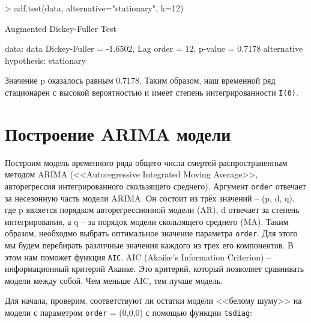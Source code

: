 \documentclass[a4paper]{extarticle}
\begin{document}
\begin{Schunk}
\begin{Sinput}
> adf.test(data, alternative="stationary", k=12)
\end{Sinput}
\begin{Soutput}
	Augmented Dickey-Fuller Test

data:  data
Dickey-Fuller = -1.6502, Lag order = 12, p-value = 0.7178
alternative hypothesis: stationary
\end{Soutput}
\end{Schunk}

Значение p оказалось равным 0.7178. Таким образом, наш временной ряд стационарен с высокой вероятностью и имеет степень интегрированности \texttt{I(0)}.


         
\section{Построение ARIMA модели}

Построим модель временного ряда общего числа смертей распространенным методом ARIMA (<<Autoregressive Integrated Moving Average>>, авторегрессия интегрированного скользящего среднего). Аргумент \texttt{order} отвечает за несезонную часть модели ARIMA. Он состоит из трёх значений -- (p, d, q), где p является порядком авторегрессионной модели (AR), d отвечает за степень интегрирования, а q -- за порядок модели скользящего среднего (MA). Таким образом, необходмо выбрать оптимальное значение параметра \texttt{order}. Для этого мы будем перебирать различные значения каждого из трех
его компонентов. В этом нам поможет функция \texttt{AIC}. AIC (Akaike’s Information Criterion) -- информационный критерий Акаике. Это критерий, который позволяет сравнивать модели между собой. Чем меньше AIC, тем лучше модель.

Для начала, проверим, соответствуют ли остатки модели <<белому шуму>> на модели с параметром \texttt{order} = (0,0,0) с помощью функции \texttt{tsdiag}:
\end{document}
